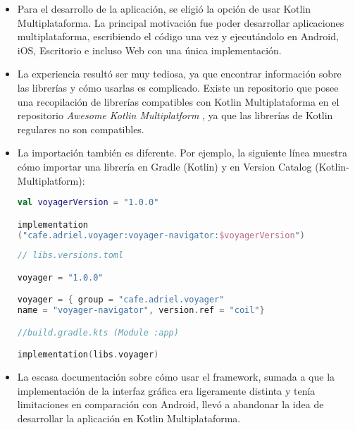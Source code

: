\documentclass[12pt,twoside,titlepage]{report}
\begin{document}
\begin{itemize}

\item Para el desarrollo de la aplicación, se eligió la opción de usar Kotlin Multiplataforma. La principal motivación fue poder desarrollar aplicaciones multiplataforma, escribiendo el código una vez y ejecutándolo en Android, iOS, Escritorio e incluso Web con una única implementación.


\item La experiencia resultó ser muy tediosa, ya que encontrar información sobre las librerías y cómo usarlas es complicado. Existe un repositorio que posee una recopilación de librerías compatibles con Kotlin Multiplataforma en el repositorio \textit{Awesome Kotlin Multiplatform} \cite{kmp-awesome}, ya que las librerías de Kotlin regulares no son compatibles.

\item La importación también es diferente. Por ejemplo, la siguiente línea muestra cómo importar una librería en Gradle (Kotlin) y en Version Catalog (Kotlin-Multiplatform):

		            \begin{lstlisting}[caption={Ejemplo de importación de librerías en Gradle.}, label={alg:gradle.kts-examples}, language=Kotlin]
val voyagerVersion = "1.0.0"

implementation
("cafe.adriel.voyager:voyager-navigator:$voyagerVersion")
\end{lstlisting}

		            \begin{lstlisting}[caption={Ejemplo de importación de librerías en Version Catalog.}, label={alg:libs.versions.kts-examples}, language=Kotlin]
// libs.versions.toml					

voyager = "1.0.0"

voyager = { group = "cafe.adriel.voyager"  
name = "voyager-navigator", version.ref = "coil"}

//build.gradle.kts (Module :app)

implementation(libs.voyager)
\end{lstlisting}

\item La escasa documentación sobre cómo usar el framework, sumada a que la implementación de la interfaz gráfica era ligeramente distinta y tenía limitaciones en comparación con Android, llevó a abandonar la idea de desarrollar la aplicación en Kotlin Multiplataforma.

\end{itemize}
\end{document}
